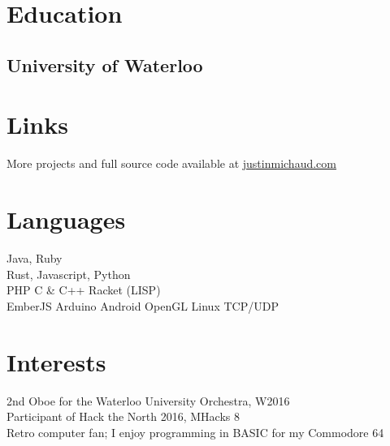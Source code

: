 \documentclass[]{deedy-resume-openfont}
\begin{document}
%
%

%
%

\begin{minipage}[t]{0.31\textwidth} 


\section{Education} 

\subsection{University of Waterloo}
\sectionsep

\section{Links}
More projects and full source code available at \href{http://justinmichaud.com}{justinmichaud.com}



\section{Languages}
Java, Ruby\\
Rust, Javascript, Python\\
PHP \textbullet{} C \& C++ \textbullet{} Racket (LISP) \\
EmberJS \textbullet{} Arduino \textbullet{} Android \textbullet{} OpenGL \textbullet{} Linux \textbullet{} TCP/UDP\\

\section{Interests}
\textbullet{} 2nd Oboe for the Waterloo University Orchestra, W2016\\
\textbullet{} Participant of Hack the North 2016, MHacks 8\\
\textbullet{} Retro computer fan; I enjoy programming in BASIC for my Commodore 64\\

%
%

\end{minipage} 
\end{document}
